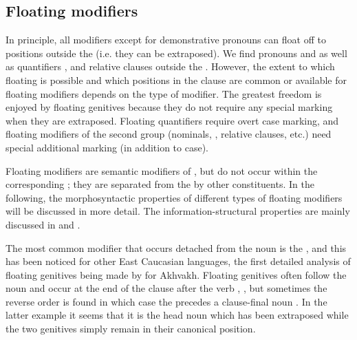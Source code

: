 \subsection{Floating modifiers}
\label{ssec:Floating modifiers}
In principle, all modifiers except for demonstrative pronouns can float off to positions outside the  (i.e. they can be extraposed). We find  pronouns  and    as well as quantifiers ,   and relative clauses  outside the . However, the extent to which floating is possible and which positions in the clause are common or available for floating modifiers depends on the type of modifier. The greatest freedom is enjoyed by floating genitives because they do not require any special marking when they are extraposed. Floating quantifiers require overt case marking, and floating modifiers of the second group (nominals, , relative clauses, etc.) need special additional marking (in addition to case). 

Floating modifiers are semantic modifiers of , but do not occur within the corresponding ; they are separated from the  by other constituents. In the following, the morphosyntactic properties of different types of floating modifiers will be discussed in more detail. The information-structural properties are mainly discussed in  and .

The most common modifier that occurs detached from the noun is the , and this has been noticed for other East Caucasian languages, the first detailed analysis of floating genitives being made by \citet{Creissels2013} for Akhvakh. Floating genitives often follow the noun and occur at the end of the clause after the verb , , but sometimes the reverse order is found in which case the  precedes a clause-final noun . In the latter example it seems that it is the head noun which has been extraposed while the two genitives simply remain in their canonical position. 


